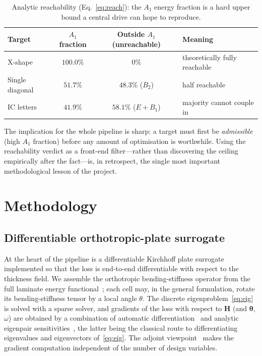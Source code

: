\documentclass[11pt,a4paper]{article}
\newcommand{\Aone}{A_1}
\newcommand{\matH}{\mathbf{H}}
\begin{document}
\begin{table}[h]
\centering
\caption{Analytic reachability (Eq.~\eqref{eq:reach}): the $\Aone$ energy
fraction is a hard upper bound a central drive can hope to reproduce.}
\label{tab:reach}
\small
\begin{tabular}{@{}lccl@{}}
\toprule
Target & $\Aone$ fraction & Outside $\Aone$ (unreachable) & Meaning \\
\midrule
X-shape          & $100.0\%$ & $0\%$            & theoretically fully reachable \\
Single diagonal  & $51.7\%$  & $48.3\%$ ($B_2$) & half reachable \\
IC letters       & $41.9\%$  & $58.1\%$ ($E{+}B_1$) & majority cannot couple in \\
\bottomrule
\end{tabular}
\end{table}

\noindent The implication for the whole pipeline is sharp: a target must first be
\emph{admissible} (high $\Aone$ fraction) before any amount of optimisation is
worthwhile. Using the reachability verdict as a front-end filter---rather than
discovering the ceiling empirically after the fact---is, in retrospect, the single
most important methodological lesson of the project.

\section{Methodology}\label{sec:method}

\subsection{Differentiable orthotropic-plate surrogate}\label{sec:surrogate}
At the heart of the pipeline is a differentiable Kirchhoff plate surrogate
implemented so that the loss is end-to-end differentiable with respect to the
thickness field. We assemble the orthotropic bending-stiffness operator from the
full laminate energy functional~\cite{reddy2003}; each cell may, in the general
formulation, rotate its bending-stiffness tensor by a local angle $\theta$. The
discrete eigenproblem~\eqref{eq:eig} is solved with a sparse solver, and gradients
of the loss with respect to $\matH$ (and $\bm\theta$, $\omega$) are obtained by a
combination of automatic differentiation~\cite{baydin2018,paszke2019} and analytic
eigenpair sensitivities~\cite{fox1968,nelson1976}, the latter being the classical
route to differentiating eigenvalues and eigenvectors of~\eqref{eq:eig}. The
adjoint viewpoint~\cite{giles2000} makes the gradient computation independent of
the number of design variables.
\end{document}
